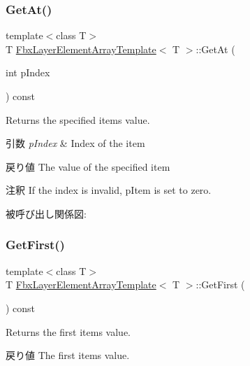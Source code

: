 \subsubsection{\texorpdfstring{Get\+At()}{GetAt()}}
{\footnotesize\ttfamily template$<$class T$>$ \\
T \hyperlink{class_fbx_layer_element_array_template}{Fbx\+Layer\+Element\+Array\+Template}$<$ T $>$\+::Get\+At (\begin{DoxyParamCaption}\item[{int}]{p\+Index }\end{DoxyParamCaption}) const}

Returns the specified item\textquotesingle{}s value. 
\begin{DoxyParams}{引数}
{\em p\+Index} & Index of the item \\
\hline
\end{DoxyParams}
\begin{DoxyReturn}{戻り値}
The value of the specified item 
\end{DoxyReturn}
\begin{DoxyRemark}{注釈}
If the index is invalid, p\+Item is set to zero. 
\end{DoxyRemark}
被呼び出し関係図\+:
\mbox{\label{class_fbx_layer_element_array_template_a76cc225d2f45a40ef77ecce9bb1dd971}} 
\subsubsection{\texorpdfstring{Get\+First()}{GetFirst()}}
{\footnotesize\ttfamily template$<$class T$>$ \\
T \hyperlink{class_fbx_layer_element_array_template}{Fbx\+Layer\+Element\+Array\+Template}$<$ T $>$\+::Get\+First (\begin{DoxyParamCaption}{ }\end{DoxyParamCaption}) const}

Returns the first item\textquotesingle{}s value. \begin{DoxyReturn}{戻り値}
The first item\textquotesingle{}s value. 
\end{DoxyReturn}
\mbox{\label{class_fbx_layer_element_array_template_a3dc0296d72de9a084d5afedaba6f5900}} 
